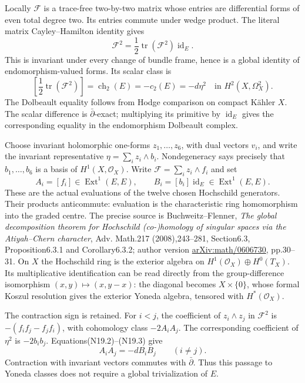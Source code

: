Locally $\mathcal F$ is a trace-free two-by-two matrix whose entries
are differential forms of even total degree two. Its entries commute
under wedge product. The literal matrix Cayley--Hamilton identity gives
\[
 \mathcal F^2=\frac12\operatorname{tr}(\mathcal F^2)
                        \operatorname{id}_E.                  \tag{N19.2}
\]
This is invariant under every change of bundle frame, hence is a
global identity of endomorphism-valued forms. Its scalar class is
\[
 \left[\frac12\operatorname{tr}(\mathcal F^2)\right]
       =\operatorname{ch}_2(E)=-c_2(E)=-d\eta^2
                      \quad\text{in }H^2(X,\Omega_X^2).         \tag{N19.3}
\]
The Dolbeault equality follows from Hodge comparison on compact
K\"ahler $X$. The scalar difference is $\bar\partial$-exact;
multiplying its primitive by $\operatorname{id}_E$ gives the
corresponding equality in the endomorphism Dolbeault complex.

Choose invariant holomorphic one-forms $z_1,\ldots,z_6$, with dual
vectors $v_i$, and write the invariant representative
$\eta=\sum_i z_i\wedge b_i$. Nondegeneracy says precisely that
$b_1,\ldots,b_6$ is a basis of $H^1(X,\mathcal O_X)$.
Write $\mathcal F=\sum_i z_i\wedge f_i$ and set
\[
 A_i=[f_i]\in\operatorname{Ext}^1(E,E),\qquad
 B_i=[b_i]\operatorname{id}_E\in\operatorname{Ext}^1(E,E).
\]
These are the actual evaluations of the twelve chosen Hochschild
generators. Their products anticommute: evaluation is the characteristic
ring homomorphism into the graded centre. The precise source is
Buchweitz--Flenner, \emph{The global decomposition theorem for Hochschild
(co-)homology of singular spaces via the Atiyah--Chern character},
Adv. Math.217 (2008),243--281, Section6.3, Proposition6.3.1 and
Corollary6.3.2; author version
\href{https://arxiv.org/pdf/math/0606730}{arXiv:math/0606730},
pp.30--31. On $X$ the Hochschild ring is the exterior algebra on
$H^1(\mathcal O_X)\oplus H^0(T_X)$. Its multiplicative identification
can be read directly from the group-difference isomorphism
$(x,y)\mapsto(x,y-x)$: the diagonal becomes $X\times\{0\}$,
whose formal Koszul resolution gives the exterior Yoneda algebra,
tensored with $H^*(\mathcal O_X)$.

The contraction sign is retained. For $i<j$, the coefficient of
$z_i\wedge z_j$ in $\mathcal F^2$ is $-(f_if_j-f_jf_i)$, with
cohomology class $-2A_iA_j$. The corresponding coefficient of
$\eta^2$ is $-2b_ib_j$. Equations(N19.2)--(N19.3) give
\[
                         A_iA_j=-dB_iB_j\qquad(i\ne j).         \tag{N19.4}
\]
Contraction with invariant vectors commutes with $\bar\partial$.
Thus this passage to Yoneda classes does not require a global
trivialization of $E$.

